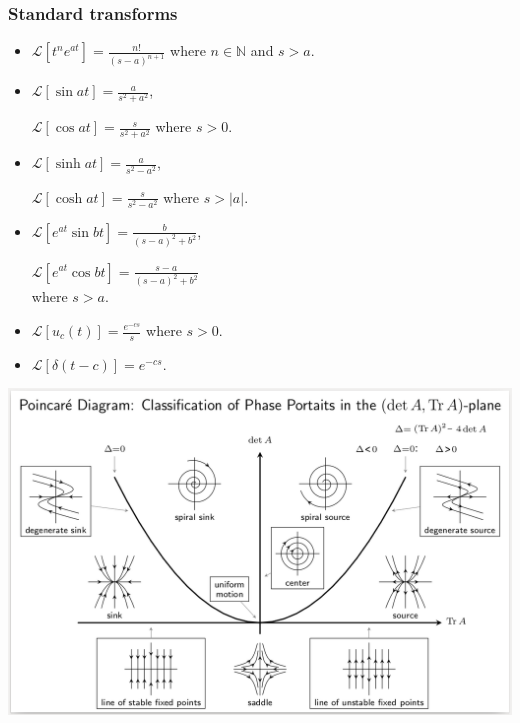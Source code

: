 \documentclass{article}
\begin{document}
\begin{multicols}{3}
\subsubsection*{Standard transforms}
\begin{itemize}
    \item $\displaystyle\mathcal{L}
    [t^n e^{at}]=\frac{n!}{(s-a)^{n+1}}$
    where $n\in\mathbb{N}$ and $s>a$.

    \item $\displaystyle\mathcal{L}
    [\sin at]=\frac{a}{s^2+a^2}$,
    
    $\displaystyle\mathcal{L}
    [\cos at]=\frac{s}{s^2+a^2}$
    where $s>0$.

    \item $\displaystyle\mathcal{L}
    [\sinh at]=\frac{a}{s^2-a^2}$,

    $\displaystyle\mathcal{L}
    [\cosh at]=\frac{s}{s^2-a^2}$
    where $s>|a|$.

    \item $\displaystyle\mathcal{L}
    [e^{at}\sin bt]=\frac{b}{(s-a)^2+b^2}$,

    $\displaystyle\mathcal{L}
    [e^{at}\cos bt]=\frac{s-a}{(s-a)^2+b^2}$ \\
    where $s>a$.

    \item $\displaystyle\mathcal{L}
    [u_c(t)]=\frac{e^{-cs}}{s}$
    where $s>0$.

    \item $\displaystyle\mathcal{L}
    [\delta(t-c)]=e^{-cs}$.
\end{itemize}
\end{multicols}
\begin{center}
    \includegraphics*[scale=0.6]{f2.png}
\end{center}
\end{document}
